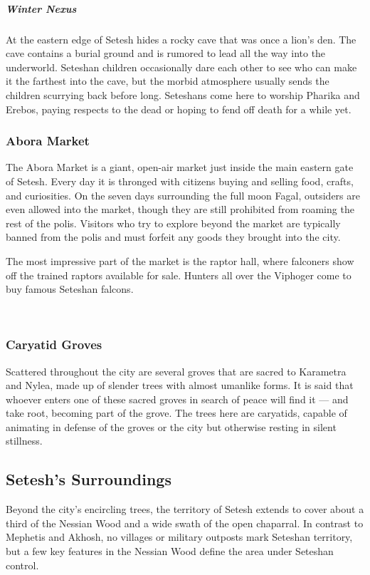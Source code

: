         \vspace{12.5cm}

        \subparagraph{Winter Nexus} At the eastern edge of Setesh hides a rocky cave that was once a lion's den.
        The cave contains a burial ground and is rumored to lead all the way into the underworld.
        Seteshan children occasionally dare each other to see who can make it the farthest into the cave, but the morbid atmosphere usually sends the children scurrying back before long.
        Seteshans come here to worship Pharika and Erebos, paying respects to the dead or hoping to fend off death for a while yet.

    \subsubsection{Abora Market}
        The Abora Market is a giant, open-air market just inside the main eastern gate of Setesh.
        Every day it is thronged with citizens buying and selling food, crafts, and curiosities.
        On the seven days surrounding the full moon Fagal, outsiders are even allowed into the market, though they are still prohibited from roaming the rest of the polis.
        Visitors who try to explore beyond the market are typically banned from the polis and must forfeit any goods they brought into the city.

        The most impressive part of the market is the raptor hall, where falconers show off the trained raptors available for sale.
        Hunters all over the Viphoger come to buy famous Seteshan falcons.

        \pagebreak~
        \vspace{12.5cm}

    \subsubsection{Caryatid Groves}
        Scattered throughout the city are several groves that are sacred to Karametra and Nylea, made up of slender trees with almost umanlike forms.
        It is said that whoever enters one of these sacred groves in search of peace will find it --- and take root, becoming part of the grove.
        The trees here are caryatids, capable of animating in defense of the groves or the city but otherwise resting in silent stillness.

\subsection*{Setesh's Surroundings}
    Beyond the city's encircling trees, the territory of Setesh extends to cover about a third of the Nessian Wood and a wide swath of the open chaparral.
    In contrast to Mephetis and Akhosh, no villages or military outposts mark Seteshan territory, but a few key features in the Nessian Wood define the area under Seteshan control.

